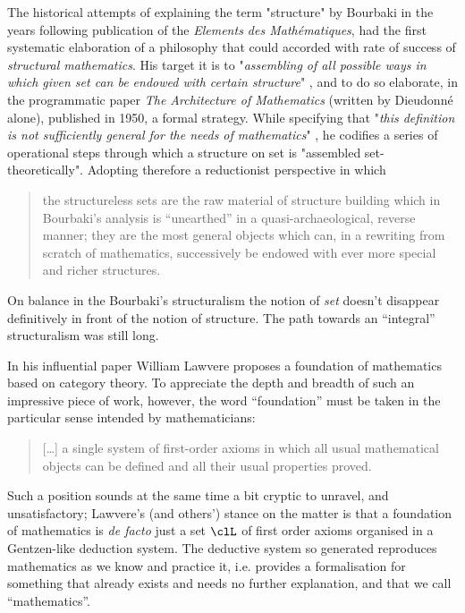 The historical attempts of explaining the term "structure" by Bourbaki in the years following publication of the \textit{Elements des Mathématiques}, had the first systematic elaboration of a philosophy that could accorded with rate of success of \textit{structural mathematics}. His target it is to "\textit{assembling of all possible ways in which given set can be endowed with certain structure}" \cite{kromer2007tool}, and to do so elaborate, in the programmatic paper \textit{The Architecture of Mathematics} (written by Dieudonné alone), published in 1950, a formal strategy. While specifying that "\textit{this definition is not sufficiently general for the needs of mathematics}" \cite{Bourb50}, he codifies a series of operational steps through which a structure on set is "assembled set-theoretically". Adopting therefore a reductionist perspective in which

\begin{quote}
	the structureless sets are the raw material of structure building which in Bourbaki’s analysis is ``unearthed'' in a quasi-archaeological, reverse manner; they are the most general objects which can, in a rewriting from scratch of mathematics, successively be endowed with ever more special and richer structures.\hfill  \cite{kromer2007tool}
\end{quote}
On balance in the Bourbaki's structuralism the notion of \emph{set} doesn't disappear definitively in front of the notion of structure. The path towards an ``integral'' structuralism was still long.

In his influential paper \cite{lajolla} William Lawvere proposes a foundation of mathematics based on category theory. To appreciate the depth and breadth of such an impressive piece of work, however, the word ``foundation'' must be taken in the particular sense intended by mathematicians:
\begin{quote}
	[\dots\unkern] a single system of first-order axioms in which all usual mathematical objects can be defined and all their usual properties proved.
\end{quote}
Such a position sounds at the same time a bit cryptic to unravel, and unsatisfactory; Lawvere's (and others') stance on the matter is that a foundation of mathematics is \emph{de facto} just a set $\clL$ of first order axioms organised in a Gentzen-like deduction system. The deductive system so generated reproduces mathematics as we know and practice it, i.e. provides a formalisation for something that already exists and needs no further explanation, and that we call ``mathematics''.

